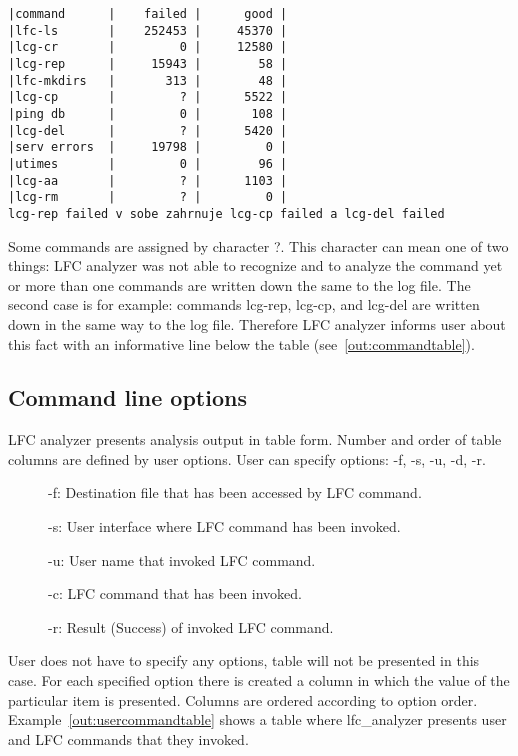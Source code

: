 \documentclass[a4paper, 11pt]{article} %
\begin{document}
\begin{lstlisting}[style=cli, label={out:commandtable}, caption={lfc\_analyzer -i logfile}]
|command      |    failed |      good |
|lfc-ls       |    252453 |     45370 |
|lcg-cr       |         0 |     12580 |
|lcg-rep      |     15943 |        58 |
|lfc-mkdirs   |       313 |        48 |
|lcg-cp       |         ? |      5522 |
|ping db      |         0 |       108 |
|lcg-del      |         ? |      5420 |
|serv errors  |     19798 |         0 |
|utimes       |         0 |        96 |
|lcg-aa       |         ? |      1103 |
|lcg-rm       |         ? |         0 |
lcg-rep failed v sobe zahrnuje lcg-cp failed a lcg-del failed
\end{lstlisting}

Some commands are assigned by character ?. This character can mean one of two things: LFC analyzer was not able to recognize and to analyze the command yet or more than one commands are written down the same to the log file. The second case is for example: commands lcg-rep, lcg-cp, and lcg-del are written down in the same way to the log file. Therefore LFC analyzer informs user about this fact with an informative line below the table (see~\ref{out:commandtable}).

\subsection{Command line options}

LFC analyzer presents analysis output in table form. Number and order of table columns are defined by user options. User can specify options: -f, -s, -u, -d, -r. 

\begin{description}
    \item[] -f: Destination file that has been accessed by LFC command.
    \item[] -s: User interface where LFC command has been invoked. 
    \item[] -u: User name that invoked LFC command.
    \item[] -c: LFC command that has been invoked.
    \item[] -r: Result (Success) of invoked LFC command.
\end{description}

User does not have to specify any options, table will not be presented in this case. For each specified option there is created a column in which the value of the particular item is presented. Columns are ordered according to option order. Example~\ref{out:usercommandtable} shows a table where lfc\_analyzer presents user and LFC commands that they invoked.
\end{document}
